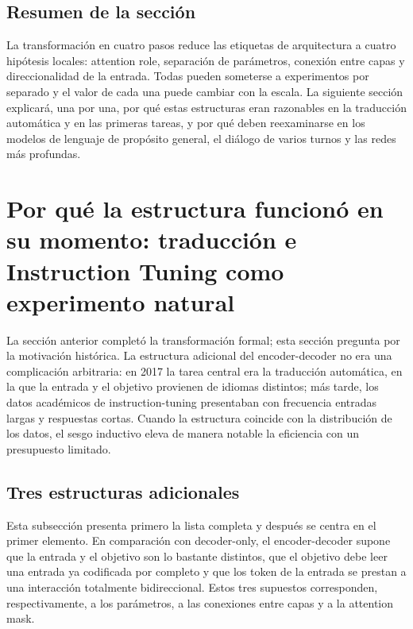 \documentclass[a4paper]{article}
\begin{document}

\subsection{Resumen de la sección}

La transformación en cuatro pasos reduce las etiquetas de arquitectura a cuatro hipótesis locales: attention role, separación de parámetros, conexión entre capas y direccionalidad de la entrada. Todas pueden someterse a experimentos por separado y el valor de cada una puede cambiar con la escala. La siguiente sección explicará, una por una, por qué estas estructuras eran razonables en la traducción automática y en las primeras tareas, y por qué deben reexaminarse en los modelos de lenguaje de propósito general, el diálogo de varios turnos y las redes más profundas.
\section{Por qué la estructura funcionó en su momento: traducción e Instruction Tuning como experimento natural}

La sección anterior completó la transformación formal; esta sección pregunta por la motivación histórica. La estructura adicional del encoder-decoder no era una complicación arbitraria: en 2017 la tarea central era la traducción automática, en la que la entrada y el objetivo provienen de idiomas distintos; más tarde, los datos académicos de instruction-tuning presentaban con frecuencia entradas largas y respuestas cortas. Cuando la estructura coincide con la distribución de los datos, el sesgo inductivo eleva de manera notable la eficiencia con un presupuesto limitado.

\subsection{Tres estructuras adicionales}

Esta subsección presenta primero la lista completa y después se centra en el primer elemento. En comparación con decoder-only, el encoder-decoder supone que la entrada y el objetivo son lo bastante distintos, que el objetivo debe leer una entrada ya codificada por completo y que los token de la entrada se prestan a una interacción totalmente bidireccional. Estos tres supuestos corresponden, respectivamente, a los parámetros, a las conexiones entre capas y a la attention mask.
\end{document}
